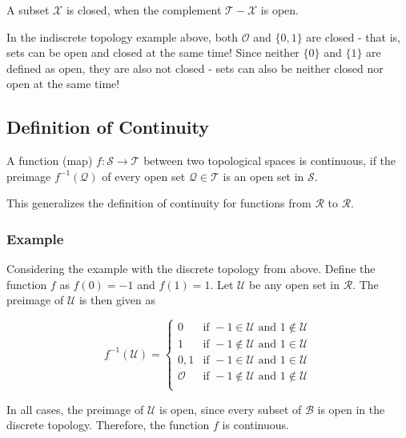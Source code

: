 A subset \(\mathcal{X}\) is closed, when the complement
\(\mathcal{T} - \mathcal{X}\) is open.

In the indiscrete topology example above, both \(\mathcal{O}\) and
\(\{0,1\}\) are closed - that is, sets can be open and closed at the
same time! Since neither \(\{0\}\) and \(\{1\}\) are defined as open,
they are also not closed - sets can also be neither closed nor open at
the same time!

\subsection{Definition of Continuity}

A function (map) \(f: \mathcal{S} \rightarrow \mathcal{T}\) between two
topological spaces is continuous, if the preimage
\(f^{-1}(\mathcal{Q})\) of every open set
\(\mathcal{Q} \in \mathcal{T}\) is an open set in \(\mathcal{S}\).

This generalizes the definition of continuity for functions from
\(\mathcal{R}\) to \(\mathcal{R}\).

\subsubsection{Example}

Considering the example with the discrete topology from above. Define
the function \(f\) as \(f(0)=-1\) and \(f(1)=1\). Let \(\mathcal{U}\) be
any open set in \(\mathcal{R}\). The preimage of \(\mathcal{U}\) is then
given as

\[
f^{-1}(\mathcal{U}) = \begin{cases}
{0} & \mbox{if }  -1 \in \mathcal{U} \mbox{ and } 1 \notin \mathcal{U} \\
{1} & \mbox{if }  -1 \notin \mathcal{U} \mbox{ and } 1 \in \mathcal{U} \\
{0,1} & \mbox{if }  -1 \in \mathcal{U} \mbox{ and } 1 \in \mathcal{U} \\
\mathcal{O} & \mbox{if }  -1 \notin \mathcal{U} \mbox{ and } 1 \notin \mathcal{U} \\
\end{cases}
\]

In all cases, the preimage of \(\mathcal{U}\) is open, since every
subset of \(\mathcal{B}\) is open in the discrete topology. Therefore,
the function \(f\) is continuous.
